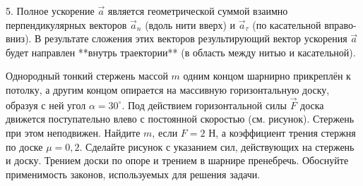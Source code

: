 \begin{taskmedium}
\begin{solutionbox}
5. Полное ускорение $\vec{a}$ является геометрической суммой взаимно перпендикулярных векторов $\vec{a}_n$ (вдоль нити вверх) и $\vec{a}_\tau$ (по касательной вправо-вниз). В результате сложения этих векторов результирующий вектор ускорения $\vec{a}$ будет направлен **внутрь траектории** (в область между нитью и касательной).
\end{solutionbox}


\end{taskmedium}

\begin{taskadvanced}
Однородный тонкий стержень массой $m$ одним концом шарнирно прикреплён к потолку, а другим концом опирается на массивную горизонтальную доску, образуя с ней угол $\alpha = 30^\circ$. Под действием горизонтальной силы $\vec{F}$ доска движется поступательно влево с постоянной скоростью (см. рисунок). Стержень при этом неподвижен. Найдите $m$, если $F = 2\text{ Н}$, а коэффициент трения стержня по доске $\mu = 0{,}2$. Сделайте рисунок с указанием сил, действующих на стержень и доску. Трением доски по опоре и трением в шарнире пренебречь. Обоснуйте применимость законов, используемых для решения задачи.

\nopagebreak\smallskip
\begin{center}
\end{center}
\end{taskadvanced}

